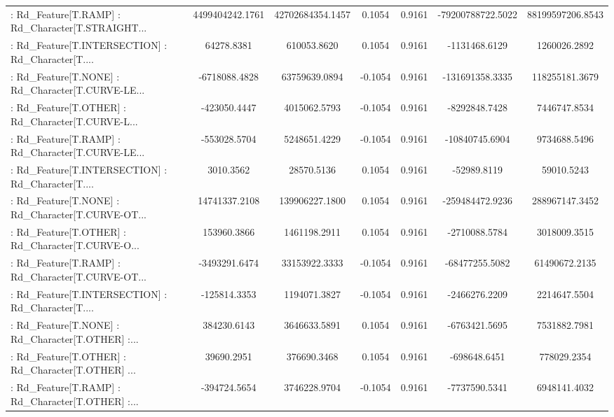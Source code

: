 \begin{longtable}{p{4cm}cccccc}
 : Rd\_Feature[T.RAMP] : Rd\_Character[T.STRAIGHT... &   4499404242.1761 &  42702684354.1457 &  0.1054 &       0.9161 &  -79200788722.5022 &  88199597206.8543 \\
 : Rd\_Feature[T.INTERSECTION] : Rd\_Character[T.... &        64278.8381 &       610053.8620 &  0.1054 &       0.9161 &      -1131468.6129 &      1260026.2892 \\
 : Rd\_Feature[T.NONE] : Rd\_Character[T.CURVE-LE... &     -6718088.4828 &     63759639.0894 & -0.1054 &       0.9161 &    -131691358.3335 &    118255181.3679 \\
 : Rd\_Feature[T.OTHER] : Rd\_Character[T.CURVE-L... &      -423050.4447 &      4015062.5793 & -0.1054 &       0.9161 &      -8292848.7428 &      7446747.8534 \\
 : Rd\_Feature[T.RAMP] : Rd\_Character[T.CURVE-LE... &      -553028.5704 &      5248651.4229 & -0.1054 &       0.9161 &     -10840745.6904 &      9734688.5496 \\
 : Rd\_Feature[T.INTERSECTION] : Rd\_Character[T.... &         3010.3562 &        28570.5136 &  0.1054 &       0.9161 &        -52989.8119 &        59010.5243 \\
 : Rd\_Feature[T.NONE] : Rd\_Character[T.CURVE-OT... &     14741337.2108 &    139906227.1800 &  0.1054 &       0.9161 &    -259484472.9236 &    288967147.3452 \\
 : Rd\_Feature[T.OTHER] : Rd\_Character[T.CURVE-O... &       153960.3866 &      1461198.2911 &  0.1054 &       0.9161 &      -2710088.5784 &      3018009.3515 \\
 : Rd\_Feature[T.RAMP] : Rd\_Character[T.CURVE-OT... &     -3493291.6474 &     33153922.3333 & -0.1054 &       0.9161 &     -68477255.5082 &     61490672.2135 \\
 : Rd\_Feature[T.INTERSECTION] : Rd\_Character[T.... &      -125814.3353 &      1194071.3827 & -0.1054 &       0.9161 &      -2466276.2209 &      2214647.5504 \\
 : Rd\_Feature[T.NONE] : Rd\_Character[T.OTHER] :... &       384230.6143 &      3646633.5891 &  0.1054 &       0.9161 &      -6763421.5695 &      7531882.7981 \\
 : Rd\_Feature[T.OTHER] : Rd\_Character[T.OTHER] ... &        39690.2951 &       376690.3468 &  0.1054 &       0.9161 &       -698648.6451 &       778029.2354 \\
 : Rd\_Feature[T.RAMP] : Rd\_Character[T.OTHER] :... &      -394724.5654 &      3746228.9704 & -0.1054 &       0.9161 &      -7737590.5341 &      6948141.4032 \\

\end{longtable}
